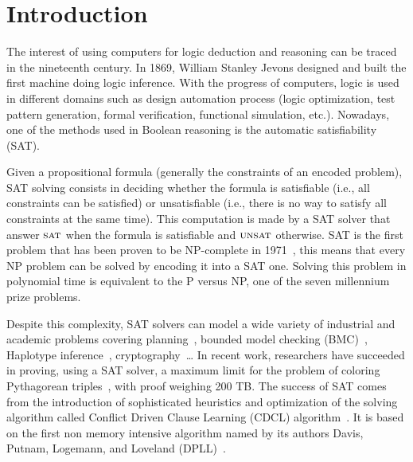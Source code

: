 \chapter{Introduction}\label{chap:intro}

The interest of using computers for logic deduction and reasoning can be traced in the nineteenth century.
In 1869,  William Stanley Jevons designed and built the first machine doing logic inference.
With the progress of computers, logic is used in different domains such as design automation process 
(logic optimization, test pattern generation, formal verification, functional simulation, etc.).
Nowadays, one of the methods used in Boolean reasoning is the automatic satisfiability (SAT).

Given a propositional formula (generally the constraints of an encoded problem),
SAT solving consists in deciding whether the formula is satisfiable (i.e., all constraints can be
satisfied) or unsatisfiable (i.e., there is no way to satisfy all constraints at the same time).
This computation is made by a SAT solver that answer $\textsc{sat}$ when the formula is satisfiable
and $\textsc{unsat}$ otherwise.
SAT is the first problem that has been proven to be NP-complete in 1971~\cite{cook1971complexity}, this 
means that every NP problem can be solved by encoding it into a SAT one. Solving this problem in 
polynomial time is equivalent to the P versus NP, one of the seven millennium prize problems.


Despite this complexity, SAT solvers can model a wide variety of industrial and academic problems
covering planning~\cite{planning_92}, bounded model checking (BMC)~\cite{bmc_99}, Haplotype inference~\cite{biology_06}, cryptography~\cite{crypto_00}\ldots
In recent work, researchers have succeeded in proving, using a SAT solver, a maximum limit
for the problem of coloring Pythagorean triples~\cite{heule2016solving}, with proof weighing 200 TB.
The success of SAT comes from the introduction of sophisticated heuristics and optimization of the solving 
algorithm called Conflict Driven Clause Learning (CDCL) algorithm~\cite{marques1999grasp}.
 It is based on the first non memory intensive algorithm named by its authors Davis, Putnam, Logemann, and Loveland (DPLL)~\cite{dpll_62}.

